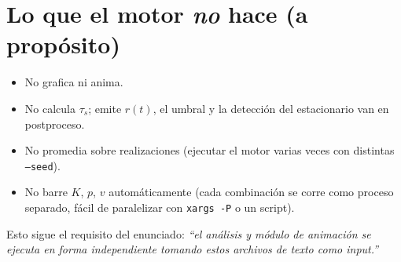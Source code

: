 \documentclass[11pt,a4paper]{article}
\begin{document}
\section{Lo que el motor \emph{no} hace (a propósito)}

\begin{itemize}
\item No grafica ni anima.
\item No calcula $\tau_s$; emite $r(t)$, el umbral y la detección del estacionario van en postproceso.
\item No promedia sobre realizaciones (ejecutar el motor varias veces con distintas \texttt{--seed}).
\item No barre $K$, $p$, $v$ automáticamente (cada combinación se corre como proceso separado, fácil de paralelizar con \texttt{xargs -P} o un script).
\end{itemize}

Esto sigue el requisito del enunciado: \emph{``el análisis y módulo de animación se ejecuta en forma independiente tomando estos archivos de texto como input.''}
\end{document}
